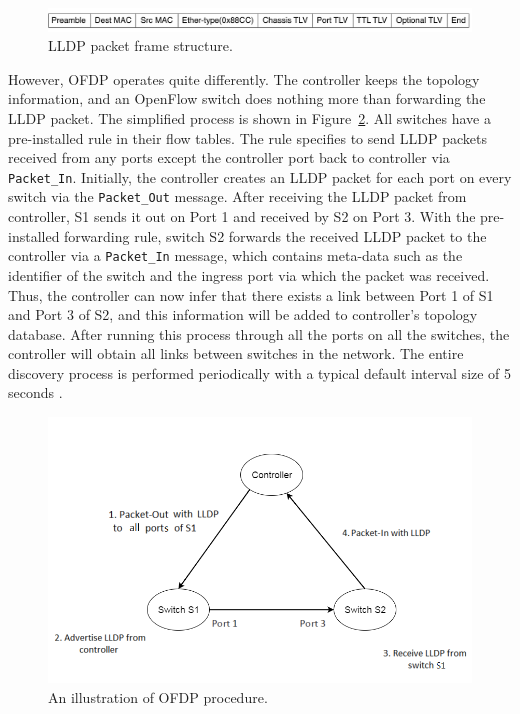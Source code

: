 \begin{figure}[H]
\begin{center} 
\includegraphics[width=1\textwidth]{figures/LLDP_packet_format.png}
\end{center}
\caption{LLDP packet frame structure. \cite{LLDP_WS}}
\label{LLDP_frame}
\end{figure}

However, OFDP operates quite differently. The controller keeps the topology information, and an OpenFlow switch does nothing more than forwarding the LLDP packet. The simplified process is shown in Figure~\ref{OFDP}. All switches have a pre-installed rule in their flow tables. The rule specifies to send LLDP packets received from any ports except the controller port back to controller via \texttt{Packet\_In}. Initially, the controller creates an LLDP packet for each port on every switch via the \texttt{Packet\_Out} message. After receiving the LLDP packet from controller, S1 sends it out on Port 1 and received by S2 on Port 3. With the pre-installed forwarding rule, switch S2 forwards the received LLDP packet to the controller via a \texttt{Packet\_In} message, which contains meta-data such as the identifier of the switch and the ingress port via which the packet was received. Thus, the controller can now infer that there exists a link between Port 1 of S1 and Port 3 of S2, and this information will be added to controller's topology database. After running this process through all the ports on all the switches, the controller will obtain all links between switches in the network. The entire discovery process is performed periodically with a typical default interval size of 5 seconds \cite{PPTI14}. 

\begin{figure}[H]
\begin{center} 
\includegraphics[width=1\textwidth]{figures/OFDP_procedure.png}
\end{center}
\caption{An illustration of OFDP procedure.}
\label{OFDP}
\end{figure}

